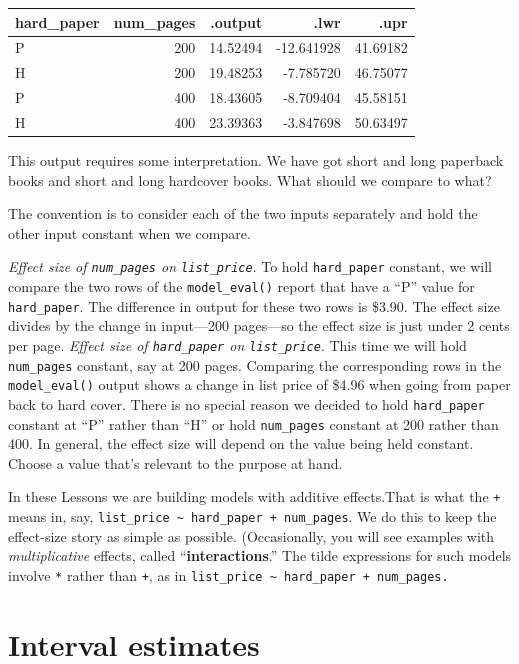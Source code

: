 \documentclass[
  letterpaper,
  DIV=11,
  numbers=noendperiod,
  oneside]{scrreprt}
\begin{document}
\ttfamily 
\begin{tabular}{lrrrr}
\toprule
hard\_paper & num\_pages & .output & .lwr & .upr\\
\midrule
P & 200 & 14.52494 & -12.641928 & 41.69182\\
H & 200 & 19.48253 & -7.785720 & 46.75077\\
P & 400 & 18.43605 & -8.709404 & 45.58151\\
H & 400 & 23.39363 & -3.847698 & 50.63497\\
\bottomrule
\end{tabular} \normalfont
\bigskip

This output requires some interpretation. We have got short and long
paperback books and short and long hardcover books. What should we
compare to what?

The convention is to consider each of the two inputs separately and hold
the other input constant when we compare.

\emph{Effect size of \texttt{num\_pages} on \texttt{list\_price}}. To
hold \texttt{hard\_paper} constant, we will compare the two rows of the
\texttt{model\_eval()} report that have a ``P'' value for
\texttt{hard\_paper}. The difference in output for these two rows is
\$3.90. The effect size divides by the change in input---200 pages---so
the effect size is just under 2 cents per page. \emph{Effect size of
\texttt{hard\_paper} on \texttt{list\_price}}. This time we will hold
\texttt{num\_pages} constant, say at 200 pages. Comparing the
corresponding rows in the \texttt{model\_eval()} output shows a change
in list price of \$4.96 when going from paper back to hard cover. There
is no special reason we decided to hold \texttt{hard\_paper} constant at
``P'' rather than ``H'' or hold \texttt{num\_pages} constant at 200
rather than 400. In general, the effect size will depend on the value
being held constant. Choose a value that's relevant to the purpose at
hand.

In these Lessons we are building models with additive effects.That is
what the \texttt{+} means in, say,
\texttt{list\_price\ \textasciitilde{}\ hard\_paper\ +\ num\_pages}. We
do this to keep the effect-size story as simple as possible.
(Occasionally, you will see examples with \emph{multiplicative} effects,
called ``\textbf{interactions}.'' The tilde expressions for such models
involve \texttt{*} rather than \texttt{+}, as in
\texttt{list\_price\ \textasciitilde{}\ hard\_paper\ +\ num\_pages.}

\hypertarget{interval-estimates}{%
\section{Interval estimates}\label{interval-estimates}}
\end{document}
